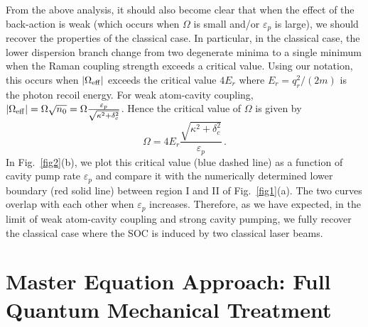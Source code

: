 \documentclass[atoms,article,submit,moreauthors,pdftex,12pt,a4paper]{mdpi}
\begin{document}
From the above analysis, it should also become clear that when the effect of the back-action is weak (which occurs when $\Omega$ is small and/or $\varepsilon_p$ is large), we should recover the properties of the classical case. In particular, in the classical case, the lower dispersion branch change from two degenerate minima to a single minimum when the Raman coupling strength exceeds a critical value. Using our notation, this occurs when $|\Omega_{\rm eff}|$ exceeds the critical value $4E_r$ where $E_r=q_r^2/(2m)$ is the photon recoil energy. For weak atom-cavity coupling, $|\Omega_{\rm eff}| = \Omega \sqrt{n_0}={\Omega} \frac{\varepsilon_p}{\sqrt{\kappa^2+ \delta_c^2}}$. Hence the critical value of $\Omega$ is given by 
\begin{equation}
\Omega=4E_r\frac{\sqrt{\kappa^2+\delta_c^2}}{\varepsilon_p}\,.
\label{ome}
\end{equation}
In Fig.~\ref{fig2}(b), we plot this critical value (blue dashed line) as a function of cavity pump rate $\varepsilon_p$ and compare it with the numerically determined lower boundary (red solid line) between region I and II of Fig.~\ref{fig1}(a). The two curves overlap with each other when $\varepsilon_p$ increases. Therefore, as we have expected, in the limit of weak atom-cavity coupling and strong cavity pumping, we fully recover the classical case where the SOC is induced by two classical laser beams.     


\section{Master Equation Approach: Full Quantum Mechanical Treatment } \label{master}
\end{document}
